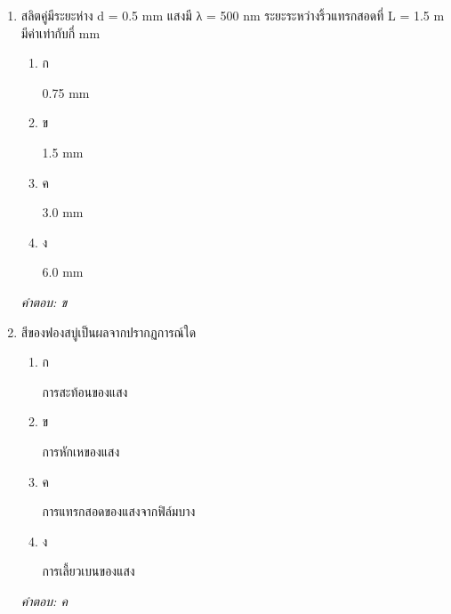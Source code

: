 \documentclass[12pt]{article}
\begin{document}
\begin{enumerate}[label=\arabic*., itemsep=0.5\baselineskip, topsep=0.5\baselineskip, leftmargin=*]
\item สลิตคู่มีระยะห่าง d = 0.5 mm แสงมี λ = 500 nm ระยะระหว่างริ้วแทรกสอดที่ L = 1.5 m มีค่าเท่ากับกี่ mm
\begin{enumerate}[label=\alph*)., itemsep=0.3\baselineskip, topsep=0.3\baselineskip]
\item ก\ 
\begin{minipage}[t]{0.9\linewidth}
\raggedright 0.75 mm
\end{minipage}
\item ข\ 
\begin{minipage}[t]{0.9\linewidth}
\raggedright 1.5 mm
\end{minipage}
\item ค\ 
\begin{minipage}[t]{0.9\linewidth}
\raggedright 3.0 mm
\end{minipage}
\item ง\ 
\begin{minipage}[t]{0.9\linewidth}
\raggedright 6.0 mm
\end{minipage}
\end{enumerate}
\vspace{-0.3\baselineskip}
\begin{small}
\textit{คำตอบ: ข}
\end{small}

\item สีของฟองสบู่เป็นผลจากปรากฏการณ์ใด
\begin{enumerate}[label=\alph*)., itemsep=0.3\baselineskip, topsep=0.3\baselineskip]
\item ก\ 
\begin{minipage}[t]{0.9\linewidth}
\raggedright การสะท้อนของแสง
\end{minipage}
\item ข\ 
\begin{minipage}[t]{0.9\linewidth}
\raggedright การหักเหของแสง
\end{minipage}
\item ค\ 
\begin{minipage}[t]{0.9\linewidth}
\raggedright การแทรกสอดของแสงจากฟิล์มบาง
\end{minipage}
\item ง\ 
\begin{minipage}[t]{0.9\linewidth}
\raggedright การเลี้ยวเบนของแสง
\end{minipage}
\end{enumerate}
\vspace{-0.3\baselineskip}
\begin{small}
\textit{คำตอบ: ค}
\end{small}


\end{enumerate}
\end{document}
